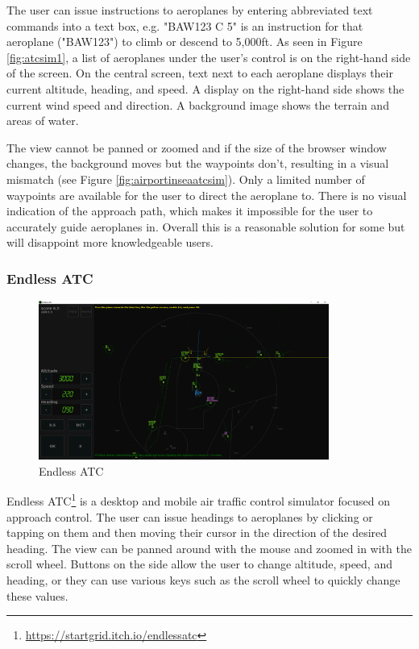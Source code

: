 \documentclass{article}
\begin{document}
The user can issue instructions to aeroplanes by entering abbreviated text commands into a text box, e.g. "BAW123 C 5" is an instruction for that aeroplane ("BAW123") to climb or descend to 5,000ft.
As seen in Figure \ref{fig:atcsim1}, a list of aeroplanes under the user's control is on the right-hand side of the screen.
On the central screen, text next to each aeroplane displays their current altitude, heading, and speed.
A display on the right-hand side shows the current wind speed and direction.
A background image shows the terrain and areas of water.

The view cannot be panned or zoomed and if the size of the browser window changes, the background moves but the waypoints don't, resulting in a visual mismatch (see Figure \ref{fig:airportinseaatcsim}).
Only a limited number of waypoints are available for the user to direct the aeroplane to.
There is no visual indication of the approach path, which makes it impossible for the user to accurately guide aeroplanes in.
Overall this is a reasonable solution for some but will disappoint more knowledgeable users.

\subsubsection{Endless ATC} \label{endlessatc}
\begin{figure}[H]
\centering
\includegraphics[width=0.85\textwidth]{existing_solutions/endlessatc.png}
\caption{\label{fig:endlessatc1}Endless ATC}
\end{figure}
Endless ATC\footnote{\url{https://startgrid.itch.io/endlessatc}} is a desktop and mobile air traffic control simulator focused on approach control.
The user can issue headings to aeroplanes by clicking or tapping on them and then moving their cursor in the direction of the desired heading.
The view can be panned around with the mouse and zoomed in with the scroll wheel.
Buttons on the side allow the user to change altitude, speed, and heading, or they can use various keys such as the scroll wheel to quickly change these values.
\end{document}
